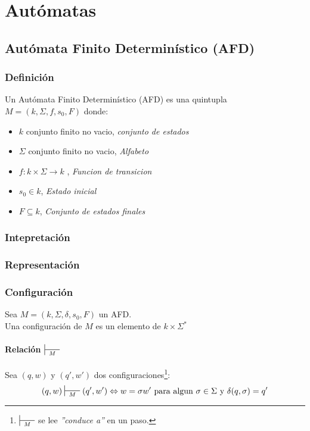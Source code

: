 \chapter{Autómatas}
\section{Autómata Finito Determinístico (AFD)}
\subsection{Definición}
Un Autómata Finito Determinístico (AFD) es una quintupla $M=(k,\Sigma,f,s_0,F)$ donde:
\begin{itemize}
\item $k$ conjunto finito no vacio, \textit{conjunto de estados}
\item $\Sigma$ conjunto finito no vacio, \textit{Alfabeto}
\item $f:k\times\Sigma\rightarrow k$ , \textit{Funcion de transicion}
\item $s_0\in k$, \textit{Estado inicial}
\item $F\subseteq k$, \textit{Conjunto de estados finales}
\end{itemize}
\subsection{Intepretación}
\subsection{Representación}
\subsection{Configuración}
Sea $M=(k,\Sigma,\delta,s_0,F)$ un AFD. \\ $ { } $ \\ 
Una configuración de $M$ es un elemento de $k\times\Sigma^*$
\subsubsection{Relación $\sststile{M}{\hspace{0.25cm}  \hspace{0.25cm}}$}
Sea $(q,w)$ y $(q',w')$ dos configuraciones\footnote{$\sststile{M}{\hspace{0.25cm} \hspace{0.25cm}}$ se lee \textit{''conduce a''} en un paso.}:
$$
(q,w)\sststile{M}{\hspace{0.25cm} \hspace{0.25cm}} (q',w')\Leftrightarrow w = \sigma w' \text{ para algun } \sigma\in\Sigma \text{ y } \delta(q,\sigma)=q'
$$
